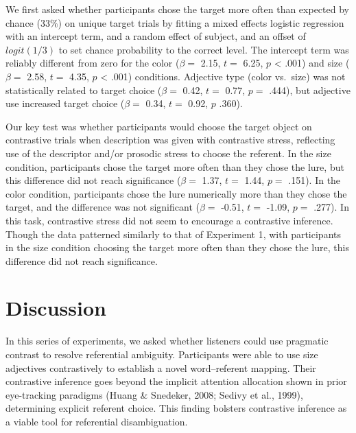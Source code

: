 \documentclass[10pt, letterpaper]{article}
\begin{document}
We first asked whether participants chose the target more often than
expected by chance (\(33\%\)) on unique target trials by fitting a mixed
effects logistic regression with an intercept term, and a random effect
of subject, and an offset of \(logit(1/3)\) to set chance probability to
the correct level. The intercept term was reliably different from zero
for the color (\(\beta =\) 2.15, \(t =\) 6.25, \(p\) \textless{} .001)
and size (\(\beta =\) 2.58, \(t =\) 4.35, \(p\) \textless{} .001)
conditions. Adjective type (color vs.~size) was not statistically
related to target choice (\(\beta =\) 0.42, \(t =\) 0.77, \(p =\) .444),
but adjective use increased target choice (\(\beta =\) 0.34, \(t =\)
0.92, \(p\) .360).

Our key test was whether participants would choose the target object on
contrastive trials when description was given with contrastive stress,
reflecting use of the descriptor and/or prosodic stress to choose the
referent. In the size condition, participants chose the target more
often than they chose the lure, but this difference did not reach
significance (\(\beta =\) 1.37, \(t =\) 1.44, \(p =\) .151). In the
color condition, participants chose the lure numerically more than they
chose the target, and the difference was not significant (\(\beta =\)
-0.51, \(t =\) -1.09, \(p =\) .277). In this task, contrastive stress
did not seem to encourage a contrastive inference. Though the data
patterned similarly to that of Experiment 1, with participants in the
size condition choosing the target more often than they chose the lure,
this difference did not reach significance.

\section{Discussion}\label{discussion}

In this series of experiments, we asked whether listeners could use
pragmatic contrast to resolve referential ambiguity. Participants were
able to use size adjectives contrastively to establish a novel
word--referent mapping. Their contrastive inference goes beyond the
implicit attention allocation shown in prior eye-tracking paradigms
(Huang \& Snedeker, 2008; Sedivy et al., 1999), determining explicit
referent choice. This finding bolsters contrastive inference as a viable
tool for referential disambiguation.
\end{document}
